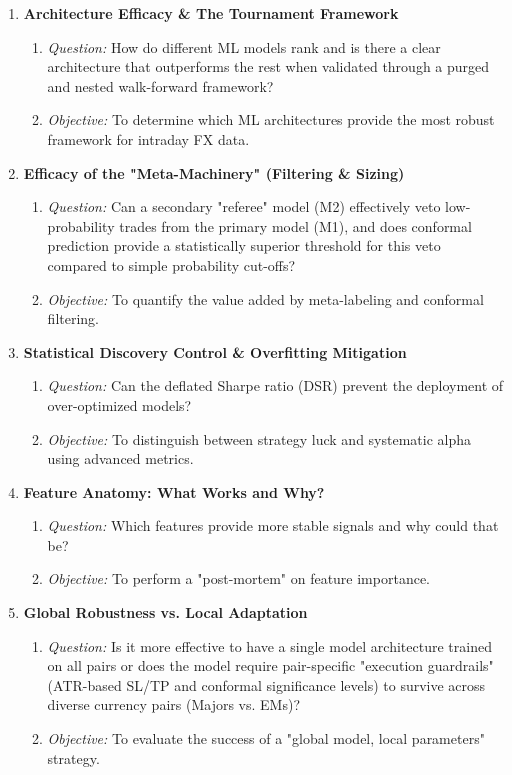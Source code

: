 \documentclass[12pt, a4paper]{article}
\begin{document}
\begin{enumerate}
  \item \textbf{Architecture Efficacy \& The Tournament Framework}
  \begin{enumerate}
    \item \textit{Question:} How do different ML models rank and is there a clear architecture that outperforms the rest 
    when validated through a purged and nested walk-forward framework?
    \item \textit{Objective:} To determine which ML architectures provide the most robust framework for intraday FX data.
  \end{enumerate}
  

  \item \textbf{Efficacy of the "Meta-Machinery" (Filtering \& Sizing)}
  \begin{enumerate}
    \item \textit{Question:} Can a secondary "referee" model (M2) effectively veto low-probability trades from the primary model (M1), 
    and does conformal prediction provide a statistically superior threshold for this veto compared to simple probability cut-offs?
    \item \textit{Objective:} To quantify the value added by meta-labeling and conformal filtering.
  \end{enumerate}


  \item \textbf{Statistical Discovery Control \& Overfitting Mitigation}
  \begin{enumerate}
    \item \textit{Question:} Can the deflated Sharpe ratio (DSR) prevent the deployment of over-optimized models?
    \item \textit{Objective:} To distinguish between strategy luck and systematic alpha using advanced metrics.
  \end{enumerate}
  

  \item \textbf{Feature Anatomy: What Works and Why?}
  \begin{enumerate}
    \item \textit{Question:} Which features provide more stable signals and why could that be?
   \item \textit{Objective:} To perform a "post-mortem" on feature importance.
  \end{enumerate}
  

  \item \textbf{Global Robustness vs. Local Adaptation}
  \begin{enumerate}
    \item \textit{Question:} Is it more effective to have a single model architecture trained on all pairs 
    or does the model require pair-specific "execution guardrails" (ATR-based SL/TP and conformal significance levels) 
    to survive across diverse currency pairs (Majors vs. EMs)?
    \item \textit{Objective:} To evaluate the success of a "global model, local parameters" strategy.
  \end{enumerate}
\end{enumerate}
\end{document}
